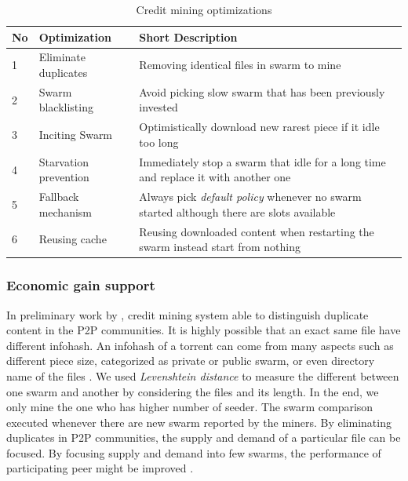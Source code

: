 \begin{table}[t]
	\centering
	\caption{Credit mining optimizations}
	\label{tbl:optimizations}
	\begin{adjustwidth}{-1.5cm}{}
		\begin{tabular}{|p{0.7cm}|p{4cm}|p{10cm}|}
		\hline
		\rowcolor[HTML]{EFEFEF} 
		\hline
		\textbf{No} & \textbf{Optimization}& \textbf{Short Description} \\ \hline
		1  & Eliminate duplicates  & Removing identical files in swarm to mine \\ \hline
		2  & Swarm blacklisting    & Avoid picking slow swarm that has been previously invested\\ \hline
		3  & Inciting Swarm & Optimistically download new rarest piece if it idle too long\\ \hline
		4  & Starvation prevention & Immediately stop a swarm that idle for a long time and replace it with another one\\ \hline
		5  & Fallback mechanism    & Always pick \textit{default policy} whenever no swarm started although there are slots available \\ \hline
		6  & Reusing cache         & Reusing downloaded content when restarting the swarm instead start from nothing \\ \hline
		\end{tabular}
	\end{adjustwidth}
\end{table}

\subsubsection{Economic gain support}
In preliminary work by \citeauthor{2015:creditmining:capota}, credit mining system able to distinguish duplicate content in the P2P communities. It is highly possible that an exact same file have different infohash. An infohash of a torrent can come from many aspects such as different piece size, categorized as private or public swarm, or even directory name of the files \cite{2015:creditmining:capota}. We used \textit{Levenshtein distance} to measure the different between one swarm and another by considering the files and its length. In the end, we only mine the one who has higher number of seeder. The swarm comparison executed whenever there are new swarm reported by the miners. By eliminating duplicates in P2P communities, the supply and demand of a particular file can be focused. By focusing supply and demand into few swarms, the performance of participating peer might be improved .

